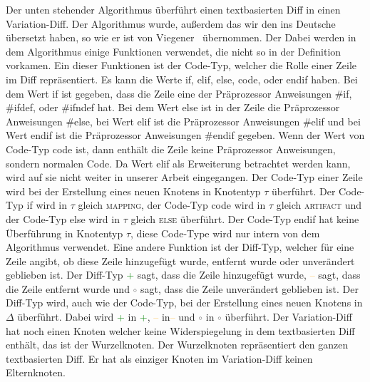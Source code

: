 Der unten stehender Algorithmus überführt einen textbasierten Diff in einen Variation-Diff. Der Algorithmus wurde, außerdem das wir den ins Deutsche übersetzt haben, so wie er ist von Viegener~\cite{Viegener21} übernommen. Der Dabei werden in dem Algorithmus einige Funktionen verwendet, die nicht so in der Definition vorkamen. Ein dieser Funktionen ist der Code-Typ, welcher die Rolle einer Zeile im Diff repräsentiert. Es kann die Werte if, elif, else, code, oder endif haben. Bei dem Wert if ist gegeben, dass die Zeile eine der Präprozessor Anweisungen \#if, \#ifdef, oder \#ifndef hat. Bei dem Wert else ist in der Zeile die Präprozessor Anweisungen \#else, bei Wert elif ist  die Präprozessor Anweisungen \#elif und bei Wert endif ist  die Präprozessor Anweisungen \#endif gegeben. Wenn der Wert von Code-Typ code ist, dann enthält die Zeile keine Präprozessor Anweisungen, sondern normalen Code. Da Wert elif als Erweiterung betrachtet werden kann, wird auf sie nicht weiter in unserer Arbeit eingegangen. Der Code-Typ einer Zeile wird bei der Erstellung eines neuen Knotens in Knotentyp $\tau$ überführt. Der Code-Typ if wird in $\tau$ gleich \textsc{mapping}, der Code-Typ code wird in $\tau$ gleich \textsc{artifact} und der Code-Typ else wird in $\tau$ gleich \textsc{else} überführt. Der Code-Typ endif hat keine Überführung in Knotentyp $\tau$, diese Code-Type wird nur intern von dem Algorithmus verwendet. Eine andere Funktion ist der Diff-Typ, welcher für eine Zeile angibt, ob diese Zeile hinzugefügt wurde, entfernt wurde oder unverändert geblieben ist. Der Diff-Typ \textcolor{green}{+} sagt, dass die Zeile hinzugefügt wurde, \textcolor{orange}{--} sagt, dass die Zeile entfernt wurde und \textcolor{gray}{$\circ$} sagt, dass die Zeile unverändert geblieben ist. Der Diff-Typ wird, auch wie der Code-Typ, bei der Erstellung eines neuen Knotens in $\Delta$ überführt. Dabei wird \textcolor{green}{+} in \textcolor{green}{+}, \textcolor{orange}{--} in\textcolor{orange}{--} und \textcolor{gray}{$\circ$} in \textcolor{gray}{$\circ$} überführt. Der Variation-Diff hat noch einen Knoten welcher keine Widerspiegelung in dem textbasierten Diff enthält, das ist der Wurzelknoten. Der Wurzelknoten repräsentiert den ganzen textbasierten Diff. Er hat als einziger Knoten im Variation-Diff keinen Elternknoten.


